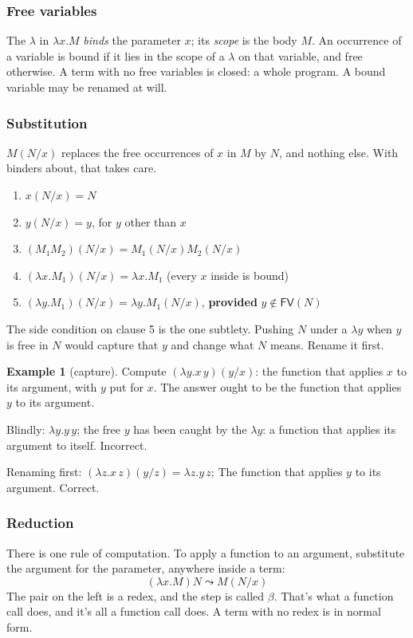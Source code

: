 \documentclass[a4paper, 11pt]{article}
\theoremstyle{definition}
\newtheorem{example}[definition]{Example}
\begin{document}
\subsubsection{Free variables}
The $\lambda$ in $\lambda x. M$ \textit{binds} the parameter $x$; its \textit{scope} is the body $M$. An occurrence of a
variable is bound if it lies in the scope of a $\lambda$ on that variable, and free otherwise. A term with no free
variables is closed: a whole program. A bound variable may be renamed at will.

\subsubsection{Substitution}
$M(N/x)$ replaces the free occurrences of $x$ in $M$ by $N$, and nothing else. With binders about, that takes care.
\begin{enumerate}
    \item $x(N/x) = N$
    \item $y(N/x) = y$, for $y$ other than $x$
    \item $(M_1 M_2)(N/x) = M_1(N/x)M_2(N/x)$
    \item $(\lambda x. M_1)(N/x) = \lambda x. M_1$ (every $x$ inside is bound)
    \item $(\lambda y. M_1)(N/x) = \lambda y. M_1(N/x)$, \textbf{provided} $y \not \in \mathsf{FV}(N)$
\end{enumerate}
The side condition on clause 5 is the one subtlety. Pushing $N$ under a $\lambda y$ when $y$ is free in $N$ would capture
that $y$ and change what $N$ means. Rename it first.

\begin{example}[capture]
    Compute $(\lambda y. x \, y)(y/x)$: the function that applies $x$ to its argument, with $y$ put for $x$. The answer
    ought to be the function that applies $y$ to its argument.

    Blindly: $\lambda y. y\, y$; the free $y$ has been caught by the $\lambda y$: a function that applies its argument
    to itself. Incorrect.

    Renaming first: $(\lambda z. x \, z)(y/z) = \lambda z. y \, z$; The function that applies $y$ to its argument. Correct.
\end{example}

\subsubsection{Reduction}
There is one rule of computation. To apply a function to an argument, substitute the argument for the parameter, anywhere
inside a term:
\[(\lambda x. M) N \leadsto M(N/x)\]
The pair on the left is a redex, and the step is called $\beta$. That's what a function call does, and it's all a function
call does. A term with no redex is in normal form.
\end{document}
